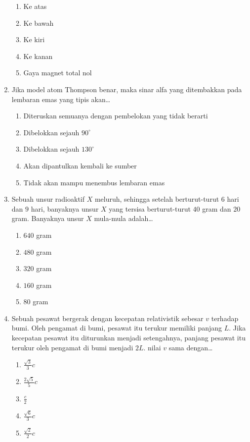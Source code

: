 \documentclass[A4,12PT, english, twocolumn]{journal}
\begin{document}
\begin{enumerate}
\begin{center}
\end{center}
   \begin{enumerate}
        \item Ke atas
        \item Ke bawah
        \item Ke kiri
        \item Ke kanan
        \item Gaya magnet total nol
   \end{enumerate}
   
\item Jika model atom Thompson benar, maka sinar alfa yang ditembakkan pada lembaran emas yang tipis akan\dots
    \begin{enumerate}
        \item Diteruskan semuanya dengan pembelokan yang tidak berarti
        \item Dibelokkan sejauh $90^\circ$
        \item Dibelokkan sejauh $130^\circ$
        \item Akan dipantulkan kembali ke sumber
        \item Tidak akan mampu menembus lembaran emas
    \end{enumerate}
  
\item Sebuah unsur radioaktif $X$ meluruh, sehingga setelah berturut-turut $6$ hari dan $9$ hari, banyaknya unsur $X$ yang tersisa berturut-turut $40$ gram dan $20$ gram. Banyaknya unsur $X$  mula-mula adalah\dots
    \begin{enumerate}
        \item $640$ gram
        \item $480$ gram
        \item $320$ gram
        \item $160$ gram
        \item $80$ gram
    \end{enumerate}
    
\item Sebuah pesawat bergerak dengan kecepatan relativistik sebesar $v$ terhadap bumi. Oleh pengamat di bumi, pesawat itu terukur memiliki panjang $L$. Jika kecepatan pesawat itu diturunkan menjadi setengahnya, panjang pesawat itu terukur oleh pengamat di bumi menjadi $2L$. nilai $v$ sama dengan\dots
    \begin{enumerate}
        \item $\frac{\sqrt{3}}{3}c$
        \item $\frac{2\sqrt{5}}{5}c$
        \item $\frac{c}{2}$
        \item $\frac{\sqrt{6}}{3}c$
        \item $\frac{\sqrt{2}}{2}c$
    \end{enumerate}


\end{enumerate}
\end{document}

